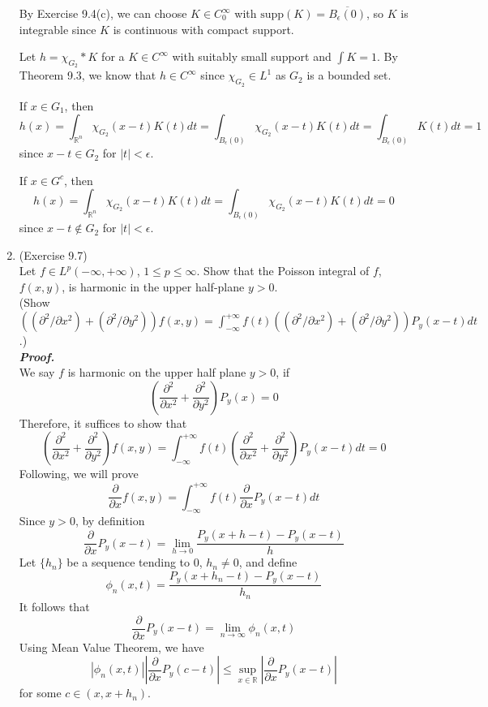 \documentclass[a4paper,11pt]{article}
\begin{document}
\begin{enumerate}
		By Exercise 9.4(c), we can choose $K \in C_0^\infty$ with $\text{supp}(K) = \overline{B_\epsilon (0)}$, so $K$ is integrable since $K$ is continuous with compact support.\

		Let $h = \chi_{G_2} \ast K$ for a $K \in C^\infty$ with suitably small support and $\int K = 1$. By Theorem 9.3, we know that $h \in C^\infty$ since $\chi_{G_2} \in L^1$ as $G_2$ is a bounded set.\

		If $x \in G_1$, then
			$$h(x)
			= \int_{\mathbb{R}^n} \chi_{G_2} (x - t) K(t) dt
			= \int_{B_\epsilon (0)} \chi_{G_2} (x - t) K(t) dt
			= \int_{B_\epsilon (0)} K(t) dt
			= 1$$
		since $x - t \in G_2$ for $|t| < \epsilon$.\

		If $x \in G^c$, then
			$$h(x)
			= \int_{\mathbb{R}^n} \chi_{G_2} (x - t) K(t) dt
			= \int_{B_\epsilon (0)} \chi_{G_2} (x - t) K(t) dt
			= 0$$
		since $x - t \notin G_2$ for $|t| < \epsilon$.\\

	\item (Exercise 9.7)\\
		Let $f \in L^p (-\infty, +\infty)$, $1 \leq p \leq \infty$.  Show that the Poisson integral of $f$, $f(x, y)$, is harmonic in the upper half-plane $y > 0$.\\ (Show $((\partial^2/\partial x^2) + (\partial^2/\partial y^2)) f(x,y) = \int_{-\infty}^{+\infty} f(t) ((\partial^2/\partial x^2) + (\partial^2/\partial y^2)) P_y (x-t) dt$.)\\
	\newline
	\textit{\textbf {Proof.}}\\

		We say $f$ is harmonic on the upper half plane $y > 0$, if 
			$$\left( \frac{\partial^2}{\partial x^2} + \frac{\partial^2}{\partial y^2} \right) P_y (x) = 0$$
		Therefore, it suffices to show that
			$$\left( \frac{\partial^2}{\partial x^2} + \frac{\partial^2}{\partial y^2} \right) f(x,y)
			= \int_{-\infty}^{+\infty} f(t) \left( \frac{\partial^2}{\partial x^2} + \frac{\partial^2}{\partial y^2} \right) P_y (x-t) dt
			= 0$$
		Following, we will prove
			$$\frac{\partial}{\partial x} f(x,y)
			= \int_{-\infty}^{+\infty} f(t) \frac{\partial}{\partial x} P_y (x-t) dt$$
		Since $y > 0$, by definition
			$$\frac{\partial}{\partial x} P_y (x-t)
			= \underset{h \to 0}{\lim} \frac{P_y (x+h-t) - P_y(x-t)}{h}$$
		Let $\{h_n\}$ be a sequence tending to 0, $h_n \neq 0$, and define
			$$\phi_n (x,t) = \frac{P_y (x+h_n-t) - P_y(x-t)}{h_n}$$
		It follows that
			$$\frac{\partial}{\partial x} P_y (x-t) = \underset{n \to \infty}{\lim} \phi_n (x,t)$$
		Using Mean Value Theorem, we have
			$$|\phi_n (x,t)|
			\left| \frac{\partial}{\partial x} P_y (c-t) \right|
			\leq \underset{x \in \mathbb{R}}{\sup} \left| \frac{\partial}{\partial x} P_y (x-t) \right|$$
		for some $c \in (x, x+h_n)$.\


\end{enumerate}
\end{document}

